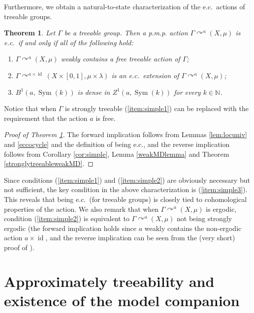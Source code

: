 \documentclass[12pt]{amsart}
\newtheorem{thm}{Theorem}[section]
\theoremstyle{definition}
\def\bb{\mathbb}
\def\bb{\mathbb}
\DeclareMathOperator{\id}{id}
\newcommand{\pmp}{p{$.$}m{$.$}p{$.$}}
\newcommand{\acts}{\curvearrowright}
\begin{document}
Furthermore, we obtain a natural-to-state characterization of the e.c.\ actions of treeable groups.

\begin{thm} \label{thm:simple}
	Let $\Gamma$ be a treeable group. Then a {\pmp} action $\Gamma \acts^a (X, \mu)$ is e.c.\ if and only if all of the following hold:
	\begin{enumerate}
		\item \label{item:simple1} $\Gamma \acts^a (X, \mu)$ weakly contains a free treeable action of $\Gamma$;
		\item \label{item:simple2} $\Gamma \acts^{a \times \id} (X \times [0,1], \mu \times \lambda)$ is an e.c.\ extension of $\Gamma \acts^a (X, \mu)$;
		\item \label{item:simple3} $B^1(a, \operatorname{Sym}(k))$ is dense in $Z^1(a, \operatorname{Sym}(k))$ for every $k \in \bb N$.
	\end{enumerate}
\end{thm}

Notice that when $\Gamma$ is strongly treeable (\ref{item:simple1}) can be replaced with the requirement that the action $a$ is free.

\begin{proof}[Proof of Theorem \ref{thm:simple}]
	The forward implication follows from Lemmas \ref{lem:locuniv} and \ref{eccocycle} and the definition of being e.c., and the reverse implication follows from Corollary \ref{cor:simple}, Lemma \ref{weakMDlemma} and Theorem \ref{stronglytreeableweakMD}.
\end{proof}

Since conditions (\ref{item:simple1}) and (\ref{item:simple2}) are obviously necessary but not sufficient, the key condition in the above characterization is (\ref{item:simple3}). This reveals that being e.c.\ (for treeable groups) is closely tied to cohomological properties of the action. We also remark that when $\Gamma \acts^a (X, \mu)$ is ergodic, condition (\ref{item:simple2}) is equivalent to $\Gamma \acts^a (X, \mu)$ not being strongly ergodic (the forward implication holds since $a$ weakly contains the non-ergodic action $a \times \id$, and the reverse implication can be seen from the (very short) proof of \cite[Theorem 3]{AW13}).

\section{Approximately treeability and existence of the model companion}\label{approximatelytreeable}
\end{document}
